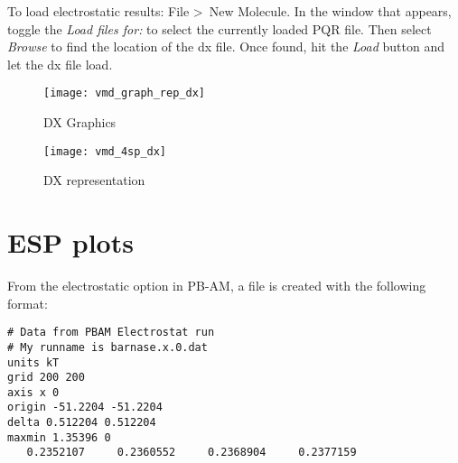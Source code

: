 To load electrostatic results: File \textgreater \, New Molecule. In the window that appears, toggle the \textit{Load files for:} 
to select the currently loaded PQR file. Then select \textit{Browse} to find the location of the dx file. Once found, hit 
the \textit{Load} button and let the dx file load.

\begin{figure}[!htbp]
  \centering
  \begin{minipage}[b]{0.3\textwidth}
    \texttt{[image: vmd\_graph\_rep\_dx]}
    \caption{DX Graphics}
  \end{minipage}
  \hfill
  \begin{minipage}[b]{0.65\textwidth}
    \texttt{[image: vmd\_4sp\_dx]}
    \caption{DX representation}
  \end{minipage}
\end{figure}

 \clearpage

%
%
%


\section{ESP plots}
From the electrostatic option in PB-AM, a file is created with the following format: \\

\begin{lstlisting}[style = MyBash]
# Data from PBAM Electrostat run
# My runname is barnase.x.0.dat
units kT
grid 200 200 
axis x 0 
origin -51.2204 -51.2204
delta 0.512204 0.512204
maxmin 1.35396 0
   0.2352107     0.2360552     0.2368904     0.2377159
\end{lstlisting}


